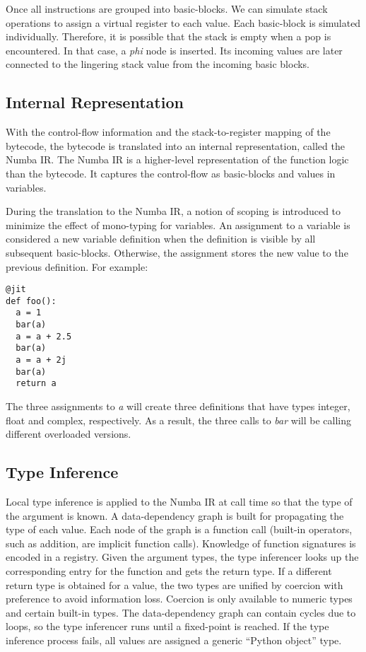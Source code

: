 \documentclass{acm_proc_article-sp}
\begin{document}
Once all instructions are grouped into basic-blocks. We can simulate stack
operations to assign a virtual register to each value.  Each basic-block is
simulated individually. Therefore, it is possible that the stack is empty when
a pop is encountered. In that case, a \textit{phi} node is inserted.
Its incoming values are later connected to the lingering stack value from the
incoming basic blocks.

\subsection{Internal Representation}

With the control-flow information and the stack-to-register mapping
of the bytecode, the bytecode is translated into an internal representation,
called the Numba IR. The Numba IR is a higher-level representation of the
function logic than the bytecode. It captures the control-flow as basic-blocks
and values in variables.

During the translation to the Numba IR, a notion of scoping is introduced to
minimize the effect of mono-typing for variables. An assignment to a variable
is considered a new variable definition when the definition is visible by all
subsequent basic-blocks. Otherwise, the assignment stores the new value to
the previous definition.  For example:

\begin{lstlisting}
@jit
def foo():
  a = 1
  bar(a)
  a = a + 2.5
  bar(a)
  a = a + 2j
  bar(a)
  return a
\end{lstlisting}

The three assignments to \textit{a} will create three definitions that have
types integer, float and complex, respectively.  As a result, the three
calls to \textit{bar} will be calling different overloaded versions.

\subsection{Type Inference}

Local type inference is applied to the Numba IR at call time so that
the type of the argument is known. A data-dependency graph is built
for propagating the type of each value.  Each node of the graph is a
function call (built-in operators, such as addition, are implicit
function calls). Knowledge of function signatures is encoded in a
registry.  Given the argument types, the type inferencer looks up the
corresponding entry for the function and gets the return type. If a
different return type is obtained for a value, the two types are
unified by coercion with preference to avoid information
loss. Coercion is only available to numeric types and certain built-in
types. The data-dependency graph can contain cycles due to loops, so
the type inferencer runs until a fixed-point is reached. If the type
inference process fails, all values are assigned a generic ``Python
object'' type.
\end{document}

